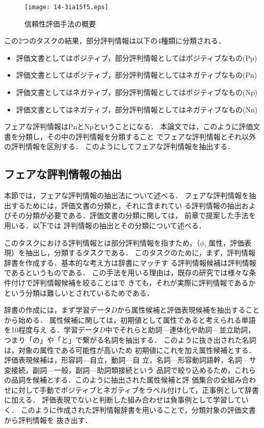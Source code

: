 \documentclass[japanese]{jnlp_1.3c}
\begin{document}
\begin{figure}[t]
 \begin{center}
      \texttt{[image: 14-3ia15f5.eps]}
  \caption{信頼性評価手法の概要}
  \label{fig:3.1}
 \end{center}
\end{figure}


この2つのタスクの結果，部分評判情報は以下の4種類に分類される．
\begin{itemize}
\item 評価文書としてはポジティブ，部分評判情報としてはポジティブなもの(Pp)
\item 評価文書としてはポジティブ，部分評判情報としてはネガティブなもの(Pn)
\item 評価文書としてはネガティブ，部分評判情報としてはポジティブなもの(Np)
\item 評価文書としてはネガティブ，部分評判情報としてはネガティブなもの(Nn)
\end{itemize}

フェアな評判情報はPnとNpということになる．
本論文では，このように評価文書を分類し，その中の評判情報を分類すること
でフェアな評判情報とそれ以外の評判情報を区別する．
このようにしてフェアな評判情報を抽出する．

\subsection{フェアな評判情報の抽出}
本節では，フェアな評判情報の抽出法について述べる．
フェアな評判情報を抽出するためには，評価文書の分類と，それに含まれてい
る評判情報の抽出およびその分類が必要である．評価文書の分類に関しては，
前章で提案した手法を用いる．以下では
評判情報の抽出とその分類について述べる\cite{iida}．

このタスクにおける評判情報とは部分評判情報を指すため，（$\phi$, 属性，評価表
現）を抽出し，分類するタスクである．
このタスクのために，まず，評判情報辞書を作成する．基本的な考え方は辞書にマッチす
る評判情報候補は評判情報であるというものである．
この手法を用いる理由は，既存の研究では様々な条件付けで評判情報候補を絞ることはで
きても，それが実際に評判情報であるかという分類は難しいとされているためである．

辞書の作成には，まず学習データ$D$から属性候補と評価表現候補を抽出することから始める．
属性候補に関しては，初期値として属性であると考えられる単語を10程度与え
る．学習データ$D$中でそれらと助詞—連体化や助詞—並立助詞，つまり「の」や「と」で繋がる名詞を抽出する．
このように抜き出された名詞は，対象の属性である可能性が高いため
初期値にこれを加え属性候補とする．評価表現候補は，形容詞—自立，動詞—自
立，名詞—形容動詞語幹，名詞—サ変接続，副詞—一般，副詞—助詞類接続という
品詞で絞り込めるため，これらの品詞を候補とする．このように抽出された属性候補と評
価集合の全組み合わせに対して手動でポジティブとネガティブをラベル付けして，正事例として辞書に加える．
評価表現でないと判断した組み合わせは負事例として学習していく．
このように作成された評判情報辞書を用いることで，分類対象の評価文書から評判情報を
抜き出す．
\end{document}
